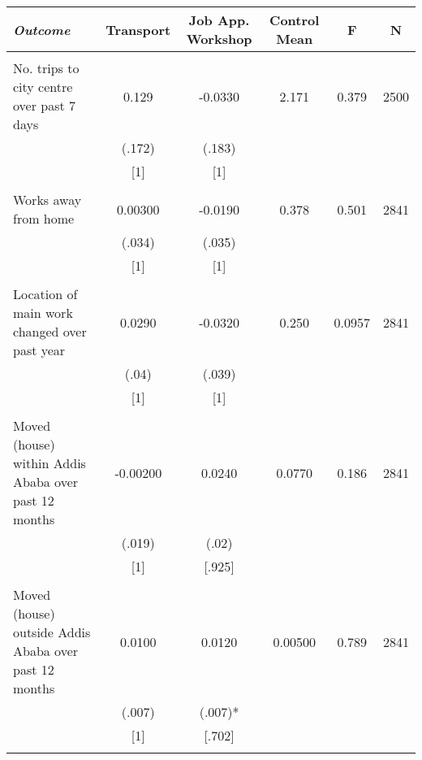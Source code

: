 \begin{tabular}{lccccc} \hline
\multicolumn{1}{l}{\emph{Outcome}} & \multicolumn{1}{c}{Transport} &\multicolumn{1}{c}{Job App. Workshop} & \multicolumn{1}{c}{Control Mean} & \multicolumn{1}{c}{F} & \multicolumn{1}{c}{N} \\ \hline \\
No. trips to city centre over past 7 days & 0.129 & -0.0330 & 2.171 & 0.379 & 2500 \\
& (.172) & (.183) &  &  &  \\
& [1] & [1] &  &  &  \\
&  &  &  &  &  \\
Works away from home & 0.00300 & -0.0190 & 0.378 & 0.501 & 2841 \\
& (.034) & (.035) &  &  &  \\
& [1] & [1] &  &  &  \\
&  &  &  &  &  \\
Location of main work changed over past year & 0.0290 & -0.0320 & 0.250 & 0.0957 & 2841 \\
& (.04) & (.039) &  &  &  \\
& [1] & [1] &  &  &  \\
&  &  &  &  &  \\
Moved (house) within Addis Ababa over past 12 months & -0.00200 & 0.0240 & 0.0770 & 0.186 & 2841 \\
& (.019) & (.02) &  &  &  \\
& [1] & [.925] &  &  &  \\
&  &  &  &  &  \\
Moved (house) outside Addis Ababa over past 12 months & 0.0100 & 0.0120 & 0.00500 & 0.789 & 2841 \\
& (.007) & (.007)* &  &  &  \\
& [1] & [.702] &  &  &  \\
&  &  &  &  &  \\ \hline
\end{tabular}
